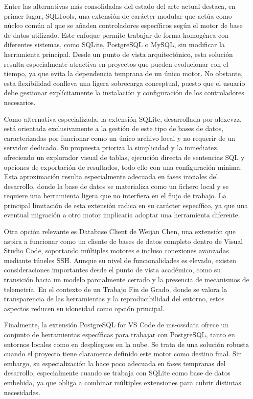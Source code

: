 Entre las alternativas más consolidadas del estado del arte actual destaca, en primer lugar, SQLTools, una extensión de carácter modular que actúa como núcleo común al que se añaden controladores específicos según el motor de base de datos utilizado. Este enfoque permite trabajar de forma homogénea con diferentes sistemas, como SQLite, PostgreSQL o MySQL, sin modificar la herramienta principal. Desde un punto de vista arquitectónico, esta solución resulta especialmente atractiva en proyectos que pueden evolucionar con el tiempo, ya que evita la dependencia temprana de un único motor. No obstante, esta flexibilidad conlleva una ligera sobrecarga conceptual, puesto que el usuario debe gestionar explícitamente la instalación y configuración de los controladores necesarios.

Como alternativa especializada, la extensión SQLite, desarrollada por alexcvzz, está orientada exclusivamente a la gestión de este tipo de bases de datos, caracterizadas por funcionar como un único archivo local y no requerir de un servidor dedicado. Su propuesta prioriza la simplicidad y la inmediatez, ofreciendo un explorador visual de tablas, ejecución directa de sentencias SQL y opciones de exportación de resultados, todo ello con una configuración mínima. Esta aproximación resulta especialmente adecuada en fases iniciales del desarrollo, donde la base de datos se materializa como un fichero local y se requiere una herramienta ligera que no interfiera en el flujo de trabajo. La principal limitación de esta extensión radica en su carácter específico, ya que una eventual migración a otro motor implicaría adoptar una herramienta diferente.

Otra opción relevante es Database Client de Weijan Chen, una extensión que aspira a funcionar como un cliente de bases de datos completo dentro de Visual Studio Code, soportando múltiples motores e incluso conexiones avanzadas mediante túneles SSH. Aunque su nivel de funcionalidades es elevado, existen consideraciones importantes desde el punto de vista académico, como su transición hacia un modelo parcialmente cerrado y la presencia de mecanismos de telemetría. En el contexto de un Trabajo Fin de Grado, donde se valora la transparencia de las herramientas y la reproducibilidad del entorno, estos aspectos reducen su idoneidad como opción principal.

Finalmente, la extensión PostgreSQL for VS Code de ms-ossdata ofrece un conjunto de herramientas específicas para trabajar con PostgreSQL, tanto en entornos locales como en despliegues en la nube. Se trata de una solución robusta cuando el proyecto tiene claramente definido este motor como destino final. Sin embargo, su especialización la hace poco adecuada en fases tempranas del desarrollo, especialmente cuando se trabaja con SQLite como base de datos embebida, ya que obliga a combinar múltiples extensiones para cubrir distintas necesidades.

